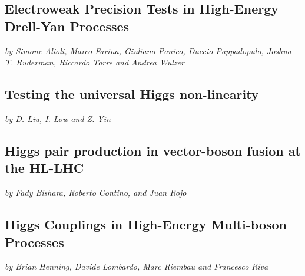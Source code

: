 \documentclass[../report.tex]{subfiles}
\providecommand{\main}{..}
\begin{document}
\subsection{Electroweak Precision Tests  in High-Energy Drell-Yan Processes} \label{DY}
\begin{center}
{\it by Simone Alioli, Marco Farina,  Giuliano Panico,  Duccio Pappadopulo,
  Joshua T. Ruderman, Riccardo Torre and Andrea Wulzer}
\end{center}



\subsection{Testing the universal Higgs non-linearity}
% 
\label{sect-illus}
\begin{center}
 {\it by D. Liu,   I. Low and Z. Yin
}
\end{center}





\subsection{Higgs pair production in vector-boson fusion at the HL-LHC}
\begin{center}
\textit{by Fady Bishara, Roberto Contino, and Juan Rojo}
\end{center}\label{sec:VVHHcont}





\subsection{Higgs Couplings in High-Energy Multi-boson Processes} \label{HwH}
\begin{center}
{\it by Brian Henning,  Davide  Lombardo,  Marc Riembau and
  Francesco Riva}
\end{center}

\end{document}
